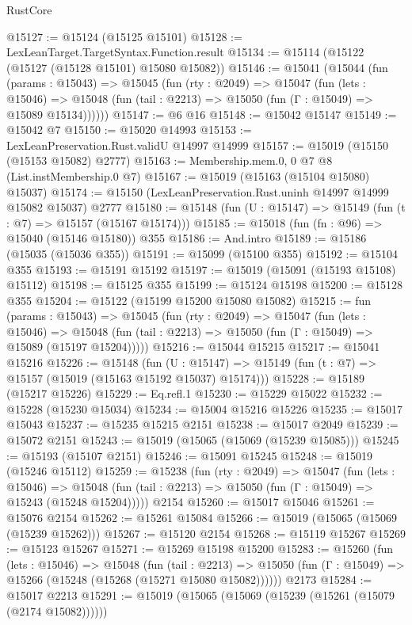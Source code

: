 \begin{lexlean}{RustCore}
\begin{coremodule}
@15127 := @15124 (@15125 @15101)
@15128 := LexLeanTarget.TargetSyntax.Function.result
@15134 := @15114 (@15122 (@15127 (@15128 @15101) @15080 @15082))
@15146 := @15041
    (@15044
      (fun (params : @15043) =>
      @15045
        (fun (rty : @2049) =>
        @15047
          (fun (lets : @15046) =>
          @15048 (fun (tail : @2213) => @15050 (fun (Γ : @15049) => @15089 @15134))))))
@15147 := @6 @16
@15148 := @15042 @15147
@15149 := @15042 @7
@15150 := @15020 @14993
@15153 := LexLeanPreservation.Rust.validU @14997 @14999
@15157 := @15019 (@15150 (@15153 @15082) @2777)
@15163 := Membership.mem.{0, 0} @7 @8 (List.instMembership.{0} @7)
@15167 := @15019 (@15163 (@15104 @15080) @15037)
@15174 := @15150 (LexLeanPreservation.Rust.uninh @14997 @14999 @15082 @15037) @2777
@15180 := @15148 (fun (U : @15147) => @15149 (fun (t : @7) => @15157 (@15167 @15174)))
@15185 := @15018 (fun (fn : @96) => @15040 (@15146 @15180)) @355
@15186 := And.intro
@15189 := @15186 (@15035 (@15036 @355))
@15191 := @15099 (@15100 @355)
@15192 := @15104 @355
@15193 := @15191 @15192
@15197 := @15019 (@15091 (@15193 @15108) @15112)
@15198 := @15125 @355
@15199 := @15124 @15198
@15200 := @15128 @355
@15204 := @15122 (@15199 @15200 @15080 @15082)
@15215 := fun (params : @15043) =>
  @15045
    (fun (rty : @2049) =>
    @15047
      (fun (lets : @15046) =>
      @15048 (fun (tail : @2213) => @15050 (fun (Γ : @15049) => @15089 (@15197 @15204)))))
@15216 := @15044 @15215
@15217 := @15041 @15216
@15226 := @15148
    (fun (U : @15147) => @15149 (fun (t : @7) => @15157 (@15019 (@15163 @15192 @15037) @15174)))
@15228 := @15189 (@15217 @15226)
@15229 := Eq.refl.{1}
@15230 := @15229 @15022
@15232 := @15228 (@15230 @15034)
@15234 := @15004 @15216 @15226
@15235 := @15017 @15043
@15237 := @15235 @15215 @2151
@15238 := @15017 @2049
@15239 := @15072 @2151
@15243 := @15019 (@15065 (@15069 (@15239 @15085)))
@15245 := @15193 (@15107 @2151)
@15246 := @15091 @15245
@15248 := @15019 (@15246 @15112)
@15259 := @15238
    (fun (rty : @2049) =>
    @15047
      (fun (lets : @15046) =>
      @15048 (fun (tail : @2213) => @15050 (fun (Γ : @15049) => @15243 (@15248 @15204)))))
    @2154
@15260 := @15017 @15046
@15261 := @15076 @2154
@15262 := @15261 @15084
@15266 := @15019 (@15065 (@15069 (@15239 @15262)))
@15267 := @15120 @2154
@15268 := @15119 @15267
@15269 := @15123 @15267
@15271 := @15269 @15198 @15200
@15283 := @15260
    (fun (lets : @15046) =>
    @15048
      (fun (tail : @2213) =>
      @15050 (fun (Γ : @15049) => @15266 (@15248 (@15268 (@15271 @15080 @15082))))))
    @2173
@15284 := @15017 @2213
@15291 := @15019 (@15065 (@15069 (@15239 (@15261 (@15079 (@2174 @15082))))))

\end{coremodule}
\end{lexlean}
